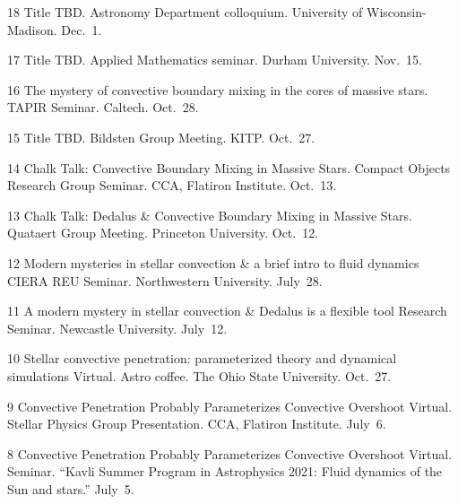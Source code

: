 
      {18}
      { 
        Title TBD.
      }
      {
        Astronomy Department colloquium. University of Wisconsin-Madison. Dec.~1.
      }

\cvpub{}
      {17}
      {
        Title TBD.  
      }
      {
        Applied Mathematics seminar. Durham University. Nov.~15.
      }



\cvpub{}
      {16}
      {
        The mystery of convective boundary mixing in the cores of massive stars.
      }
      {
        TAPIR Seminar. Caltech. Oct.~28.
      }

\cvpub{}
      {15}
      {
        Title TBD.  
      }
      {
        Bildsten Group Meeting. KITP. Oct.~27.
      }

\cvpub{}
      {14}
      {
        Chalk Talk: Convective Boundary Mixing in Massive Stars.  
      }
      {
        Compact Objects Research Group Seminar. CCA, Flatiron Institute. Oct.~13.
      }

\cvpub{}
      {13}
      {
        Chalk Talk: Dedalus \& Convective Boundary Mixing in Massive Stars.  
      }
      {
        Quataert Group Meeting. Princeton University. Oct.~12.
      }



\cvpub{}
      {12}
      {  
        Modern mysteries in stellar convection \& a brief intro to fluid dynamics
      }
      {
        CIERA REU Seminar. Northwestern University. July~28.
      }



\cvpub{}
      {11}
      { A modern mystery in stellar convection \& Dedalus is a flexible tool }
      {
        Research Seminar. Newcastle University. July~12.
      }

	  {10}
	  {Stellar convective penetration: parameterized theory and dynamical simulations}
	  {
	  	Virtual. Astro coffee. The Ohio State University. Oct.~27.
	  }

\cvpub{}
	  {9}
	  {Convective Penetration Probably Parameterizes Convective Overshoot}
	  {
	  	Virtual. Stellar Physics Group Presentation. CCA, Flatiron Institute. July~6.
	  }

\cvpub{}
	  {8}
	  {Convective Penetration Probably Parameterizes Convective Overshoot}
	  {
	  	Virtual. Seminar. ``Kavli Summer Program in Astrophysics 2021: Fluid dynamics of the Sun and stars.'' July~5.
	  }


